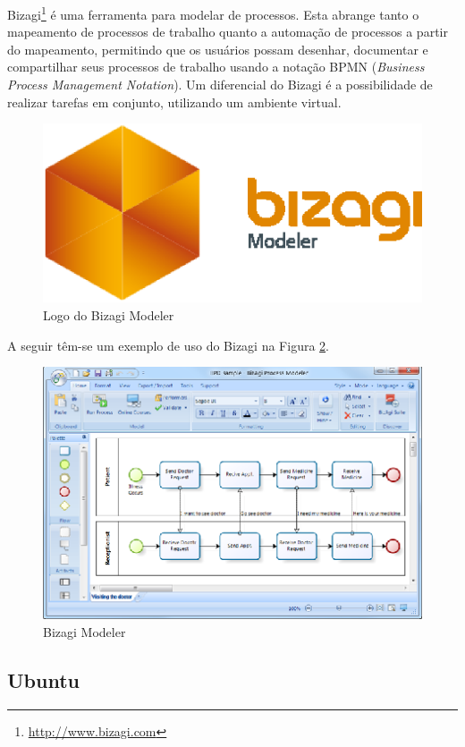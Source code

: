 Bizagi\footnote{\url{http://www.bizagi.com}} é uma ferramenta para modelar de processos. Esta abrange tanto o mapeamento de processos de trabalho quanto a automação de processos a partir do mapeamento, permitindo que os usuários possam desenhar, documentar e compartilhar seus processos de trabalho usando a notação BPMN (\textit{Business Process Management Notation}). Um diferencial do Bizagi é a possibilidade de realizar tarefas em conjunto, utilizando um ambiente virtual.

\begin{figure}[!h]
	\centering
	\includegraphics[scale=0.4]{figuras/capitulo3/logo_bizagi.eps}
	\caption{Logo do Bizagi Modeler}
	\label{logo_bizagi}
\end{figure}

A seguir têm-se um exemplo de uso do Bizagi na Figura \ref{bizagi}.

\begin{figure}[!h]
	\centering
	\includegraphics[scale=1.5]{figuras/capitulo3/bizagi.eps}
	\caption{Bizagi Modeler}
	\label{bizagi}
\end{figure}

\subsection{Ubuntu}


